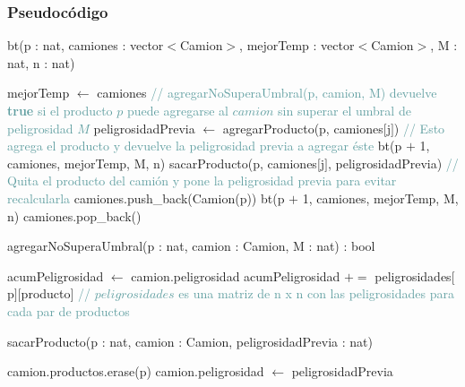 \subsubsection{Pseudoc\'odigo}
\begin{algorithm}[H]
\begin{algorithmic}[1]
\caption{bt(p : nat, camiones : vector$<$Camion$>$, mejorTemp : vector$<$Camion$>$, M : nat, n : nat)}
	\STATE mejorTemp $\leftarrow$ camiones
    \RETURN
\ENDIF
{}
	\RETURN
\ENDIF
{}
	\STATE \textcolor{CadetBlue}{// agregarNoSuperaUmbral(p, camion, M) devuelve \textbf{true} si el producto $p$ puede agregarse al $camion$ sin superar el umbral de peligrosidad $M$}
		\STATE peligrosidadPrevia $\leftarrow$ agregarProducto(p, camiones$[$j$]$) \textcolor{CadetBlue}{// Esto agrega el producto y devuelve la peligrosidad previa a agregar éste}
		\STATE bt(p $+$ 1, camiones, mejorTemp, M, n)
		\STATE sacarProducto(p, camiones$[$j$]$, peligrosidadPrevia) \textcolor{CadetBlue}{// Quita el producto del camión y pone la peligrosidad previa para evitar recalcularla}
	\ENDIF
\ENDFOR
{}
	\STATE camiones.push\_back(Camion(p))
	\STATE bt(p $+$ 1, camiones, mejorTemp, M, n)
	\STATE camiones.pop\_back()
\ENDIF
\RETURN
\end{algorithmic}
\end{algorithm}

\begin{algorithm}[H]
\begin{algorithmic}[1]
\caption{agregarNoSuperaUmbral(p : nat, camion : Camion, M : nat) : bool}
\STATE acumPeligrosidad $\leftarrow$ camion.peligrosidad
	\STATE acumPeligrosidad $+=$ peligrosidades$[$p$][$producto$]$ \textcolor{CadetBlue}{// $peligrosidades$ es una matriz de n x n con las peligrosidades para cada par de productos}
		\RETURN \FALSE
	\ENDIF
\ENDFOR
\RETURN \TRUE
\end{algorithmic}
\end{algorithm}

\begin{algorithm}[H]
\begin{algorithmic}[1]
\caption{sacarProducto(p : nat, camion : Camion, peligrosidadPrevia : nat)}
\STATE camion.productos.erase(p)
\STATE camion.peligrosidad $\leftarrow$ peligrosidadPrevia
\end{algorithmic}
\end{algorithm}

